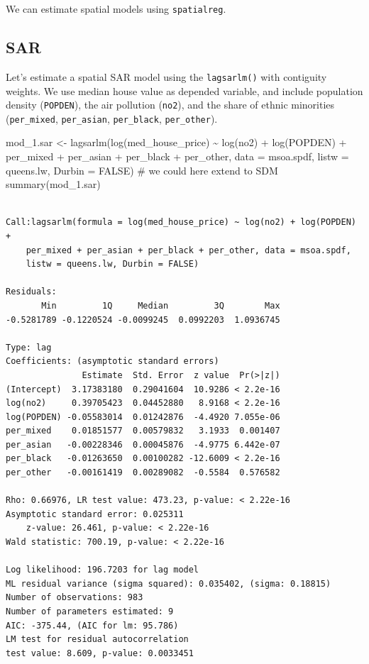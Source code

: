 \documentclass[
  letterpaper,
  DIV=11,
  numbers=noendperiod]{scrreprt}
\newenvironment{Shaded}{\begin{snugshade}}{\end{snugshade}}
\newcommand{\AttributeTok}[1]{\textcolor[rgb]{0.40,0.45,0.13}{#1}}
\newcommand{\CommentTok}[1]{\textcolor[rgb]{0.37,0.37,0.37}{#1}}
\newcommand{\ConstantTok}[1]{\textcolor[rgb]{0.56,0.35,0.01}{#1}}
\newcommand{\FunctionTok}[1]{\textcolor[rgb]{0.28,0.35,0.67}{#1}}
\newcommand{\NormalTok}[1]{\textcolor[rgb]{0.00,0.23,0.31}{#1}}
\newcommand{\OtherTok}[1]{\textcolor[rgb]{0.00,0.23,0.31}{#1}}
\newcommand{\SpecialCharTok}[1]{\textcolor[rgb]{0.37,0.37,0.37}{#1}}
\begin{document}
We can estimate spatial models using \texttt{spatialreg}.

\hypertarget{sar}{%
\subsection{SAR}\label{sar}}

Let's estimate a spatial SAR model using the \texttt{lagsarlm()} with
contiguity weights. We use median house value as depended variable, and
include population density (\texttt{POPDEN}), the air pollution
(\texttt{no2}), and the share of ethnic minorities (\texttt{per\_mixed},
\texttt{per\_asian}, \texttt{per\_black}, \texttt{per\_other}).

\begin{Shaded}
\begin{Highlighting}[]
\NormalTok{mod\_1.sar }\OtherTok{\textless{}{-}} \FunctionTok{lagsarlm}\NormalTok{(}\FunctionTok{log}\NormalTok{(med\_house\_price) }\SpecialCharTok{\textasciitilde{}} \FunctionTok{log}\NormalTok{(no2) }\SpecialCharTok{+} \FunctionTok{log}\NormalTok{(POPDEN) }\SpecialCharTok{+} 
\NormalTok{                        per\_mixed }\SpecialCharTok{+}\NormalTok{ per\_asian }\SpecialCharTok{+}\NormalTok{ per\_black }\SpecialCharTok{+}\NormalTok{ per\_other,  }
                      \AttributeTok{data =}\NormalTok{ msoa.spdf, }
                      \AttributeTok{listw =}\NormalTok{ queens.lw,}
                      \AttributeTok{Durbin =} \ConstantTok{FALSE}\NormalTok{) }\CommentTok{\# we could here extend to SDM}
\FunctionTok{summary}\NormalTok{(mod\_1.sar)}
\end{Highlighting}
\end{Shaded}

\begin{verbatim}

Call:lagsarlm(formula = log(med_house_price) ~ log(no2) + log(POPDEN) + 
    per_mixed + per_asian + per_black + per_other, data = msoa.spdf, 
    listw = queens.lw, Durbin = FALSE)

Residuals:
       Min         1Q     Median         3Q        Max 
-0.5281789 -0.1220524 -0.0099245  0.0992203  1.0936745 

Type: lag 
Coefficients: (asymptotic standard errors) 
               Estimate  Std. Error  z value  Pr(>|z|)
(Intercept)  3.17383180  0.29041604  10.9286 < 2.2e-16
log(no2)     0.39705423  0.04452880   8.9168 < 2.2e-16
log(POPDEN) -0.05583014  0.01242876  -4.4920 7.055e-06
per_mixed    0.01851577  0.00579832   3.1933  0.001407
per_asian   -0.00228346  0.00045876  -4.9775 6.442e-07
per_black   -0.01263650  0.00100282 -12.6009 < 2.2e-16
per_other   -0.00161419  0.00289082  -0.5584  0.576582

Rho: 0.66976, LR test value: 473.23, p-value: < 2.22e-16
Asymptotic standard error: 0.025311
    z-value: 26.461, p-value: < 2.22e-16
Wald statistic: 700.19, p-value: < 2.22e-16

Log likelihood: 196.7203 for lag model
ML residual variance (sigma squared): 0.035402, (sigma: 0.18815)
Number of observations: 983 
Number of parameters estimated: 9 
AIC: -375.44, (AIC for lm: 95.786)
LM test for residual autocorrelation
test value: 8.609, p-value: 0.0033451
\end{verbatim}
\end{document}
